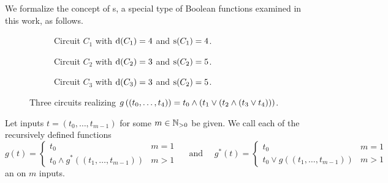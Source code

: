 We formalize the concept of \aop{}s, a special type of Boolean functions
examined in this work, as follows.

\begin{figure}[t]
 \hfill
 \begin{subfigure}[t]{0.3\textwidth}
 \begin{center}
  \end{center}
  \caption{Circuit $C_1$ with $\operatorname{d}(C_1) = 4$ and $\operatorname{s}(C_1) = 4$.}
  \label{ex-aop-delay-1}
 \end{subfigure}
\hspace*{0.03\textwidth}
 \begin{subfigure}[t]{0.3\textwidth}
 \begin{center}
 \end{center}
\caption{Circuit $C_2$ with $\operatorname{d}(C_2) = 3$ and $\operatorname{s}(C_2) = 5$.}
  \label{ex-aop-delay-2}
 \end{subfigure}
\hspace*{0.03\textwidth}
 \begin{subfigure}[t]{0.3\textwidth}
 \begin{center}
 \end{center}
\caption{Circuit $C_3$ with $\operatorname{d}(C_3) = 3$ and $\operatorname{s}(C_2) = 5$.}
  \label{ex-aop-delay-3}
 \end{subfigure}
\hfill
 \caption{Three circuits realizing
 $g\left({\left({t_0, \dotsc, t_4}\right)}\right) = t_0 \land \left({t_1 \lor \left({t_2 \land \left({t_3 \lor t_4}\right)}\right)}\right)$.}
 \label{ex-aop-delay}
\end{figure}

\begin{definition}\label{def-aop}
   Let inputs $t = (t_0, \dotsc, t_{m-1})$ for some $m \in \mathbb N_{> 0}$ be given.
   We call each of the recursively defined functions
   \[g(t) = \begin{cases}
                    t_0 & m = 1 \\
                    t_0 \land g^*((t_1, \dotsc, t_{m-1})) & m > 1
                 \end{cases} \quad \text{ and } \quad
    g^*(t) = \begin{cases}
                    t_0 & m = 1 \\
                    t_0 \lor g((t_1, \dotsc, t_{m-1})) & m > 1
                 \end{cases} \]
   an \emph{\aop} on $m$ inputs.
\end{definition}

